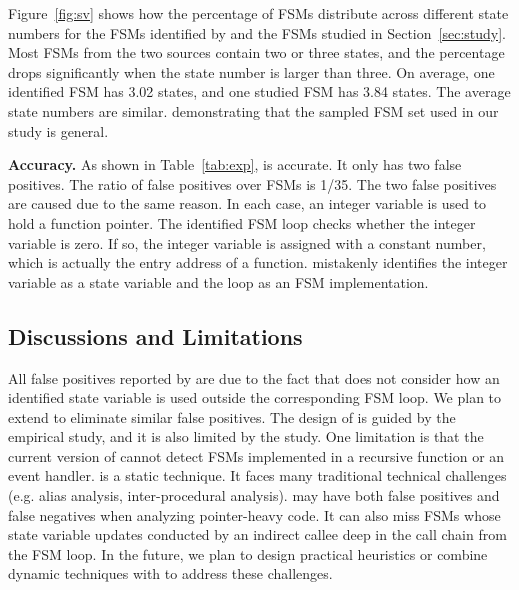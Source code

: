 Figure~\ref{fig:sv} shows how the percentage of FSMs distribute 
across different state numbers for the FSMs identified by \Tool{} 
and the FSMs studied in Section~\ref{sec:study}. 
Most FSMs from the two sources contain two or three states, 
and the percentage drops significantly when the state number is larger than three. 
On average, one identified FSM has 3.02 states, 
and one studied FSM has 3.84 states. 
The average state numbers are similar. 
demonstrating that the sampled FSM set used in our study is general. 




\noindent\textbf{Accuracy.}
As shown in Table~\ref{tab:exp}, \Tool{} is accurate.
It only has two false positives.
The ratio of false positives over FSMs is 1/35.
The two false positives are caused due to the same reason.
In each case, an integer variable is used to hold a function pointer.
The identified FSM loop checks whether the integer variable is zero. %
If so, the integer variable is assigned with a constant number,
which is actually the entry address of a function.
\Tool{} mistakenly identifies the integer variable as a state variable 
and the loop as an FSM implementation.



\subsection{Discussions and Limitations}

All false positives reported by \Tool{} are due to the fact that 
\Tool{} does not consider how an identified state variable is used outside 
the corresponding FSM loop. 
We plan to extend \Tool{} to eliminate similar false positives. 
The design of \Tool{} is guided by the empirical study, and it is also limited by the study. 
One limitation is that the current version of \Tool{} cannot detect FSMs implemented 
in a recursive function or an event handler. 
\Tool{} is a static technique. 
It faces many traditional technical challenges (e.g. alias analysis, inter-procedural analysis).
\Tool{} may have both false positives and false negatives when analyzing 
pointer-heavy code. 
It can also miss FSMs whose state variable updates conducted 
by an indirect callee deep in the call chain from the FSM loop. 
In the future, we plan to design practical 
heuristics or combine dynamic techniques with \Tool{} to address these challenges. 
  
 


